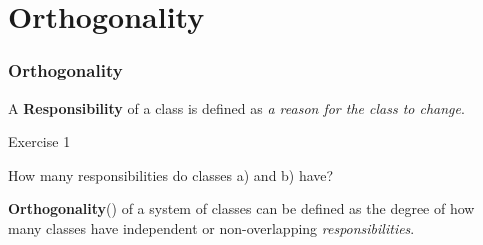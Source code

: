 \documentclass[9pt]{beamer}
\begin{document}
\section{Orthogonality}
\begin{frame}
  \frametitle{Orthogonality}
  \begin{definition}
    A \textbf{Responsibility} of a class is defined as \emph{a reason for the class to change}.
  \end{definition}
  \vfill
  \pause
  \begin{exampleblock}{Exercise 1}
    \begin{center}
      \Large
      How many responsibilities do classes a) and b) have?
    \end{center}
  \end{exampleblock}
\pause
  \vfill
  \begin{definition}
    \textbf{Orthogonality}(\cite{PP}) of a system of classes can be defined as the degree of how many classes have independent or non-overlapping \emph{responsibilities}.
  \end{definition}

\end{frame}
\end{document}
